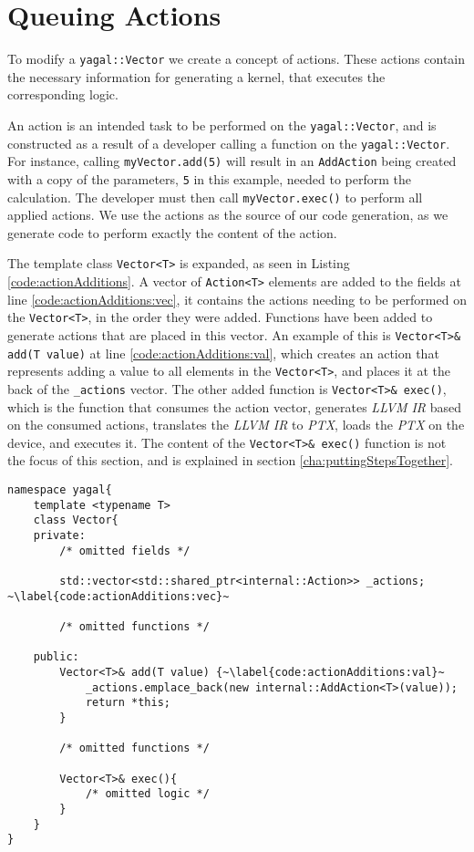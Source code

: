 \section{Queuing Actions} \label{cha:queueingActions}
To modify a \texttt{yagal::Vector} we create a concept of actions. These actions contain the necessary information for generating a kernel, that executes the corresponding logic.

An action is an intended task to be performed on the \texttt{yagal::Vector}, and is constructed as a result of a developer calling a function on the \texttt{yagal::Vector}. For instance, calling \texttt{myVector.add(5)} will result in an \texttt{AddAction} being created with a copy of the parameters, \texttt{5} in this example, needed to perform the calculation. The developer must then call \texttt{myVector.exec()} to perform all applied actions. We use the actions as the source of our code generation, as we generate code to perform exactly the content of the action.

The template class \texttt{Vector<T>} is expanded, as seen in Listing \ref{code:actionAdditions}. A vector of \texttt{Action<T>} elements are added to the fields at line \ref{code:actionAdditions:vec}, it contains the actions needing to be performed on the \texttt{Vector<T>}, in the order they were added. Functions have been added to generate actions that are placed in this vector. An example of this is \texttt{Vector<T>\& add(T value)} at line \ref{code:actionAdditions:val}, which creates an action that represents adding a value to all elements in the \texttt{Vector<T>}, and places it at the back of the \texttt{\_actions} vector. The other added function is \texttt{Vector<T>\& exec()}, which is the function that consumes the action vector, generates \textit{LLVM IR} based on the consumed actions, translates the \textit{LLVM IR} to \textit{PTX}, loads the \textit{PTX} on the device, and executes it. The content of the \texttt{Vector<T>\& exec()} function is not the focus of this section, and is explained in section \ref{cha:puttingStepsTogether}.

\begin{lstlisting}[caption={Vector<T> action additions.}, label={code:actionAdditions}]
namespace yagal{
    template <typename T>
    class Vector{
    private:
        /* omitted fields */

        std::vector<std::shared_ptr<internal::Action>> _actions; ~\label{code:actionAdditions:vec}~

        /* omitted functions */
    
    public:
        Vector<T>& add(T value) {~\label{code:actionAdditions:val}~
            _actions.emplace_back(new internal::AddAction<T>(value));
            return *this;
        }
        
        /* omitted functions */

        Vector<T>& exec(){
            /* omitted logic */
        }
    }
}
\end{lstlisting}

